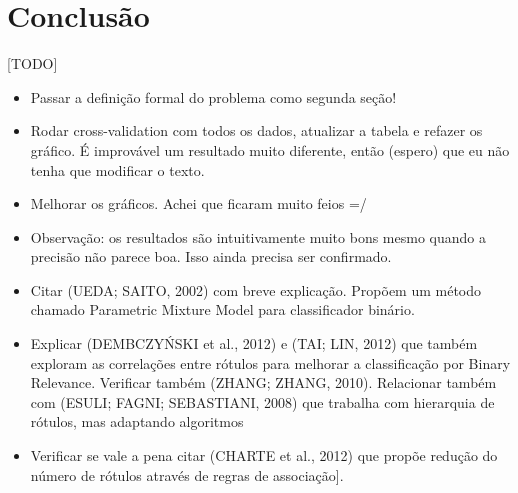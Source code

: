 \documentclass[runningheads,a4paper]{llncs}
\begin{document}
\section{Conclusão} \label{sec:conclusao}

[TODO]
\begin{itemize}
	\item Passar a definição formal do problema como segunda seção!
	\item Rodar cross-validation com todos os dados, atualizar a tabela e refazer os gráfico. É improvável um resultado muito diferente, então (espero) que eu não tenha que modificar o texto.
	\item Melhorar os gráficos. Achei que ficaram muito feios =/
	\item Observação: os resultados são intuitivamente muito bons mesmo quando a precisão não parece boa. Isso ainda precisa ser confirmado.
	\item Citar (UEDA; SAITO, 2002) com breve explicação. Propõem um método chamado Parametric Mixture Model para classificador binário.
	\item Explicar (DEMBCZYŃSKI et al., 2012) e (TAI; LIN, 2012) que também exploram as correlações entre rótulos para melhorar a classificação por Binary Relevance. Verificar também (ZHANG; ZHANG, 2010). Relacionar também com (ESULI; FAGNI; SEBASTIANI, 2008) que trabalha com hierarquia de rótulos, mas adaptando algoritmos
	\item Verificar se vale a pena citar (CHARTE et al., 2012) que propõe redução do número de rótulos através de regras de associação].
\end{itemize}



\end{document}
